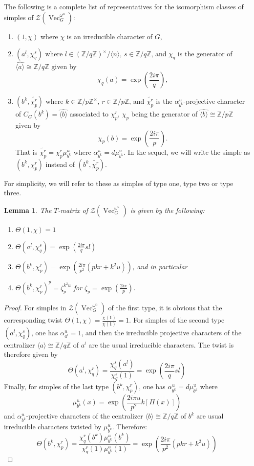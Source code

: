 \documentclass[11pt]{book}
\newtheorem{Lem}[theorem]{Lemma}
\theoremstyle{Rem}
\theoremstyle{definition}
\numberwithin{equation}{section}
\newcommand\Vect{\operatorname{Vec}}
\newcommand\ZZ{\mathbb Z}
\newcommand\CTR{\mathcal Z}
\begin{document}
The following is a complete list of representatives for the isomorphism classes of simples of $\CTR(\Vect_G^{\omega^u})$:
\begin{enumerate}
\item
$(1,\chi)$ where $\chi$ is an irreducible character of $G$,
\item
$(a^l,\chi_q^s)$ where $l\in (\ZZ/q\ZZ)^\times/\langle n\rangle$, $s\in\ZZ/q\ZZ$,
and $\chi_q$ is the generator of $\widehat{\langle a \rangle}\cong \ZZ/q\ZZ$ given by
$$
\chi_q(a)=\exp\left(\frac{2i\pi}{q}\right),
$$ 
\item
$(b^k,\widetilde{\chi_p^r})$ where $k\in\ZZ/p\ZZ^\times$, $r\in \ZZ/p\ZZ$, and $\widetilde{\chi_p^r}$ is the $\alpha_{b^k}^u$-projective character of $C_G(b^k)=\widehat{\langle b \rangle}$ associated to $\chi_p^r$, $\chi_p$ being the generator of $\widehat{\langle b \rangle}\cong \ZZ/p\ZZ$ given by
$$
\chi_p(b)=\exp\left(\frac{2i\pi}{p}\right).
$$ 
That is $\widetilde{\chi_p^r}=\chi_p^r \mu_{b^k}^u$ where $\alpha_{b^k}^u=d \mu_{b^k}^u$. In the sequel, we will write the simple as $(b^k,\chi_p^r)$ instead of $(b^k,\widetilde{\chi_p^r})$.
\end{enumerate}
For simplicity, we will refer to these as simples of type one, type two or type three.
\begin{Lem}\label{TLem}
The $T$-matrix of $\CTR(\Vect_G^{\omega^u})$ is given by the following:
\begin{enumerate}
\item
$\Theta(1,\chi)=1$
\item
$\Theta(a^l,\chi_q^s)=\exp\left(\frac{2i\pi}{q}sl\right)$
\item
$\Theta(b^k,\chi_p^r)=\exp\left(\frac{2i\pi}{p^2}(pkr+k^2u)\right)$, and in particular
\item $\Theta(b^k,\chi_p^r)^p=\zeta_p^{k^2u}$ for $\zeta_p=\exp(\frac{2i\pi}{p})$.
\end{enumerate}
\end{Lem}
\begin{proof}
For simples in $\CTR(\Vect_G^{\omega^u})$ of the first type, it is obvious that the corresponding twist $\Theta(1,\chi)=\frac{\chi(1)}{\chi(1)}=1$. For simples of the second type $(a^l,\chi_q^s)$, one has $\alpha_{a^l}^u=1$, and then the irreducible projective characters of the centralizer $\langle a \rangle \cong \ZZ/q\ZZ$ of $a^l$ are the usual irreducible characters. The twist is therefore given by 
$$
\Theta(a^l,\chi_q^r)=\frac{\chi_q^s(a^l)}{\chi_q^s(1)}=\exp\left(\frac{2i\pi}{q}sl\right)
$$
Finally, for simples of the last type $(b^k,\chi_p^r)$, one has $\alpha_{b^k}^u=d \mu_{b^k}^u$ where
$$
\mu_{b^k}^u(x)=\exp\left(\frac{2i\pi u}{p^2}k[\Pi(x)]\right)
$$
and $\alpha_{b^k}^u$-projective characters of the centralizer $\langle b \rangle \cong \ZZ/q\ZZ$ of $b^k$ are usual irreducible characters twisted by $\mu_{b^k}^u$. Therefore:
$$
\Theta(b^k,\chi_p^r)=\frac{\chi_q^r(b^k)\mu_{b^k}^u(b^k)}{\chi_q^r(1)\mu_{b^k}^u(1)}=\exp\left(\frac{2i\pi}{p^2}(pkr+k^2u)\right)
$$
\end{proof}
\end{document}
